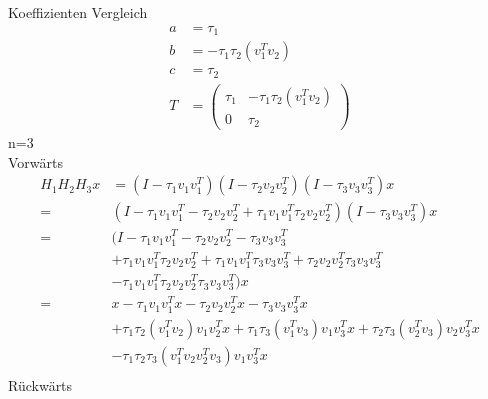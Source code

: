 Koeffizienten Vergleich
\begin{align*}
a &= \tau_1 \\
b &=-  \tau_1 \tau_2 (v_1^T v_2) \\
c &= \tau_2 \\
T &=
\begin{pmatrix}
\tau_1 & - \tau_1 \tau_2 (v_1^T v_2)\\ 0 & \tau_2
\end{pmatrix}
\end{align*}
\newpage
n=3\\
Vorwärts \\
\begin{align*}
	H_1 H_2 H_3 x &= (I-\tau_1 v_1 v_1^T)(I-\tau_2 v_2 v_2^T)(I-\tau_3 v_3 v_3^T)x\\
	= &(I - \tau_1 v_1 v_1^T - \tau_2 v_2 v_2^T +  \tau_1 v_1 v_1^T \tau_2 v_2 v_2^T )(I-\tau_3 v_3 v_3^T)x\\
	= &(I - \tau_1 v_1 v_1^T - \tau_2 v_2 v_2^T - \tau_3 v_3 v_3^T \\
	&+ \tau_1 v_1 v_1^T \tau_2 v_2 v_2^T 
	+ \tau_1 v_1 v_1^T \tau_3 v_3 v_3^T
	+ \tau_2 v_2 v_2^T \tau_3 v_3 v_3^T\\
	&- \tau_1 v_1 v_1^T \tau_2 v_2 v_2^T \tau_3 v_3 v_3^T )x \\
	= &x - \tau_1 v_1 v_1^Tx - \tau_2 v_2 v_2^Tx - \tau_3 v_3 v_3^Tx \\
    &+ \tau_1 \tau_2  (v_1^T v_2) v_1  v_2^T x
	+ \tau_1 \tau_3  (v_1^T v_3) v_1  v_3^T x
	+ \tau_2 \tau_3  (v_2^T v_3) v_2  v_3^T x\\
    &- \tau_1 \tau_2  \tau_3 (v_1^T v_2 v_2^T v_3) v_1  v_3^T x \\
\end{align*}
Rückwärts\\
